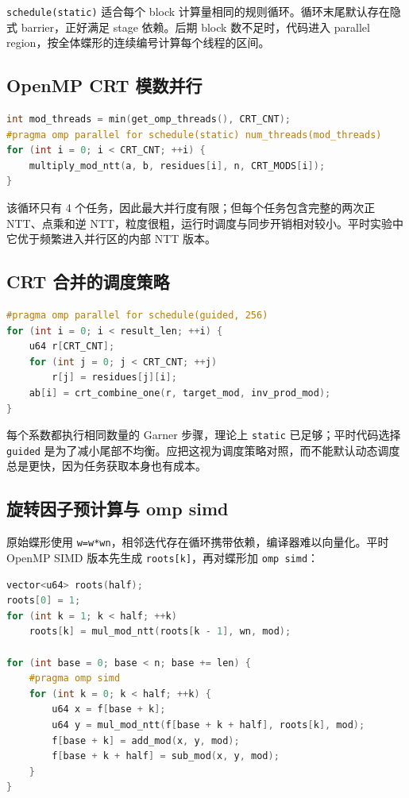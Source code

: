 \texttt{schedule(static)} 适合每个 block 计算量相同的规则循环。循环末尾默认存在隐式 barrier，正好满足 stage 依赖。后期 block 数不足时，代码进入 parallel region，按全体蝶形的连续编号计算每个线程的区间。

\subsection{OpenMP CRT 模数并行}

\begin{lstlisting}[title=四模数OpenMP任务并行,label={lst:omp-mod},language={C++}]
int mod_threads = min(get_omp_threads(), CRT_CNT);
#pragma omp parallel for schedule(static) num_threads(mod_threads)
for (int i = 0; i < CRT_CNT; ++i) {
    multiply_mod_ntt(a, b, residues[i], n, CRT_MODS[i]);
}
\end{lstlisting}

该循环只有 4 个任务，因此最大并行度有限；但每个任务包含完整的两次正 NTT、点乘和逆 NTT，粒度很粗，运行时调度与同步开销相对较小。平时实验中它优于频繁进入并行区的内部 NTT 版本。

\subsection{CRT 合并的调度策略}

\begin{lstlisting}[title=CRT输出系数的guided调度,label={lst:omp-crt},language={C++}]
#pragma omp parallel for schedule(guided, 256)
for (int i = 0; i < result_len; ++i) {
    u64 r[CRT_CNT];
    for (int j = 0; j < CRT_CNT; ++j)
        r[j] = residues[j][i];
    ab[i] = crt_combine_one(r, target_mod, inv_prod_mod);
}
\end{lstlisting}

每个系数都执行相同数量的 Garner 步骤，理论上 \texttt{static} 已足够；平时代码选择 \texttt{guided} 是为了减小尾部不均衡。应把这视为调度策略对照，而不能默认动态调度总是更快，因为任务获取本身也有成本。

\subsection{旋转因子预计算与 omp simd}

原始蝶形使用 \texttt{w=w*wn}，相邻迭代存在循环携带依赖，编译器难以向量化。平时 OpenMP SIMD 版本先生成 \texttt{roots[k]}，再对蝶形加 \texttt{omp simd}：

\begin{lstlisting}[title=消除旋转因子依赖后的omp simd,label={lst:omp-simd},language={C++}]
vector<u64> roots(half);
roots[0] = 1;
for (int k = 1; k < half; ++k)
    roots[k] = mul_mod_ntt(roots[k - 1], wn, mod);

for (int base = 0; base < n; base += len) {
    #pragma omp simd
    for (int k = 0; k < half; ++k) {
        u64 x = f[base + k];
        u64 y = mul_mod_ntt(f[base + k + half], roots[k], mod);
        f[base + k] = add_mod(x, y, mod);
        f[base + k + half] = sub_mod(x, y, mod);
    }
}
\end{lstlisting}

